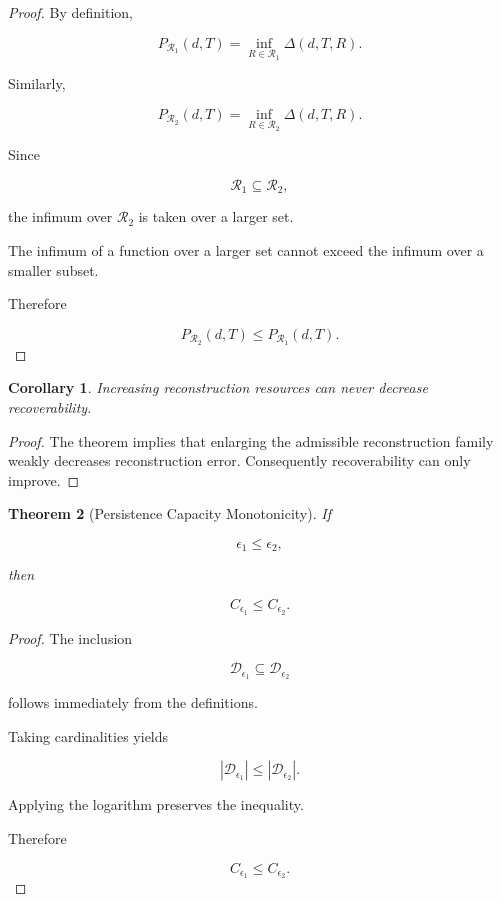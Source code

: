 \documentclass[12pt,oneside]{article}
\newtheorem{theorem}{Theorem}[section] \newtheorem{lemma}[theorem]{Lemma} \newtheorem{proposition}[theorem]{Proposition} \newtheorem{corollary}[theorem]{Corollary}
\theoremstyle{definition}
\begin{document}
\begin{proof}

By definition,

\[
P_{\mathcal R_1}(d,T)
=
\inf_{R\in\mathcal R_1}
\Delta(d,T,R).
\]

Similarly,

\[
P_{\mathcal R_2}(d,T)
=
\inf_{R\in\mathcal R_2}
\Delta(d,T,R).
\]

Since

\[
\mathcal R_1
\subseteq
\mathcal R_2,
\]

the infimum over \(\mathcal R_2\) is taken over a larger set.

The infimum of a function over a larger set cannot exceed the infimum over a smaller subset.

Therefore

\[
P_{\mathcal R_2}(d,T)
\le
P_{\mathcal R_1}(d,T).
\]

\end{proof}

\begin{corollary}

Increasing reconstruction resources can never decrease recoverability.

\end{corollary}

\begin{proof}

The theorem implies that enlarging the admissible reconstruction family weakly decreases reconstruction error. Consequently recoverability can only improve.

\end{proof}

\begin{theorem}[Persistence Capacity Monotonicity]

If

\[
\epsilon_1
\le
\epsilon_2,
\]

then

\[
C_{\epsilon_1}
\le
C_{\epsilon_2}.
\]

\end{theorem}

\begin{proof}

The inclusion

\[
\mathcal D_{\epsilon_1}
\subseteq
\mathcal D_{\epsilon_2}
\]

follows immediately from the definitions.

Taking cardinalities yields

\[
|\mathcal D_{\epsilon_1}|
\le
|\mathcal D_{\epsilon_2}|.
\]

Applying the logarithm preserves the inequality.

Therefore

\[
C_{\epsilon_1}
\le
C_{\epsilon_2}.
\]

\end{proof}
\end{document}
